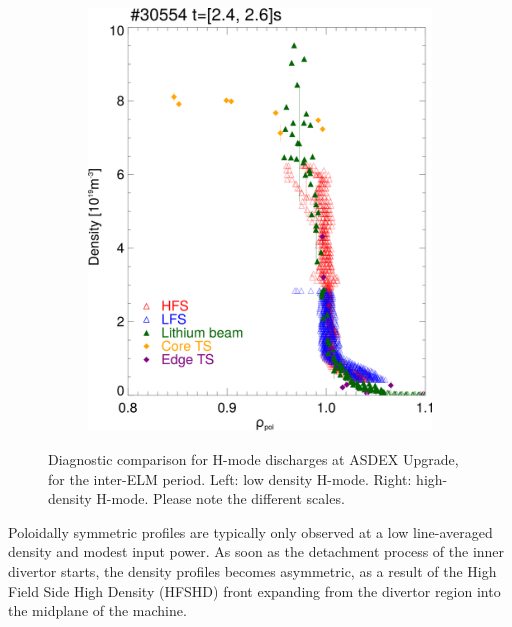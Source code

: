 \documentclass[12pt]{iopart}
\begin{document}
\begin{figure}[!hbt]
\begin{subfigure}{3in}
    \includegraphics[scale=0.5]{diaggcomp_augped_hmode30554.png}
	\caption*{}
	\end{subfigure}
	\caption{Diagnostic comparison for H-mode discharges at ASDEX Upgrade, for the inter-ELM period. Left: low density H-mode. Right: high-density H-mode. Please note the different scales.}
	\label{fig:diag_comp}
\end{figure}

Poloidally symmetric profiles are typically only observed at a low line-averaged density and modest input power. As soon as the detachment process of the inner divertor starts, the density profiles becomes asymmetric, as a result of the High Field Side High Density (HFSHD)\cite{mccormick2009main,Potzel2014} front expanding from the divertor region into the midplane of the machine\cite{Guimarais2015}.
\end{document}
